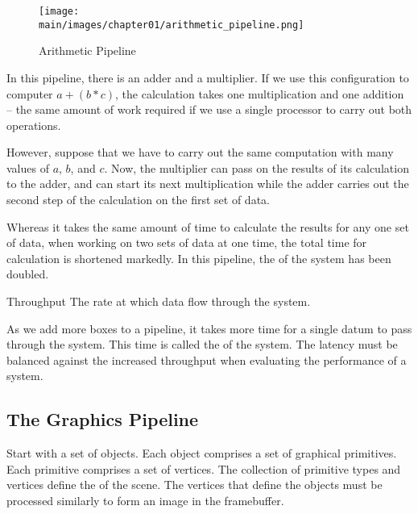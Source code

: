 \documentclass[\main/notes.tex]{subfiles}
\begin{document}
        \begin{example}
          \begin{wrapfigure}{r}{0.5\textwidth}
            \begin{center}
              \texttt{[image: \\main/images/chapter01/arithmetic\_pipeline.png]}
            \end{center}
            \caption{Arithmetic Pipeline}
          \end{wrapfigure}
          In this pipeline, there is an adder and a multiplier.
          If we use this configuration to computer $a + (b * c)$,
          the calculation takes one multiplication and one addition
          -- the same amount of work required if we use a single processor
          to carry out both operations.

          However, suppose that we have to carry out the same computation
          with many values of $a$, $b$, and $c$.
          Now, the multiplier can pass on the results of its calculation
          to the adder,
          and can start its next multiplication
          while the adder carries out the second step of the calculation
          on the first set of data.

          Whereas it takes the same amount of time to calculate the results
          for any one set of data,
          when working on two sets of data at one time,
          the total time for calculation is shortened markedly.
          In this pipeline, the  of the system
          has been doubled.
        \end{example}

        \begin{definition}{Throughput}
          The rate at which data flow through the system.
        \end{definition}

        As we add more boxes to a pipeline,
        it takes more time for a single datum to pass through the system.
        This time is called the  of the system.
        The latency must be balanced against the increased throughput
        when evaluating the performance of a system.

      \subsection{The Graphics Pipeline}
        Start with a set of objects.
        Each object comprises a set of graphical primitives.
        Each primitive comprises a set of vertices.
        The collection of primitive types and vertices define
        the  of the scene.
        The vertices that define the objects
        must be processed similarly to form an image in the framebuffer.
\end{document}
